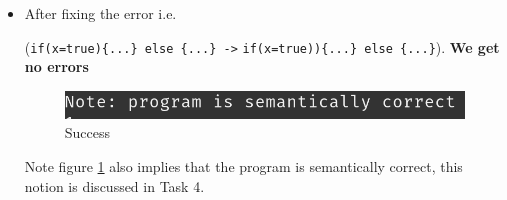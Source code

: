 \begin{itemize}
    \item After fixing the error i.e.
    
    (\verb!if(x=true){...} else {...} ->! \verb!if(x=true)){...} else {...}!).  \textbf{We get no errors}
    \begin{figure}[H]
        \centering
        \includegraphics[scale=0.9]{Task2/image/pass.png}
        \caption{Success}
        \label{fig:succes parse test}
    \end{figure}
    Note figure \ref{fig:succes parse test} also implies that the program is semantically correct, this notion is discussed in Task 4.
\end{itemize}